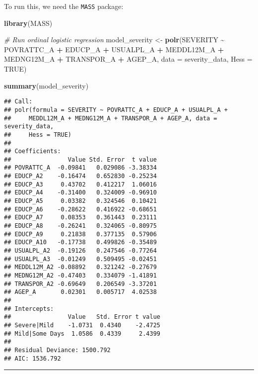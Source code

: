 \documentclass[
]{article}
\newenvironment{Shaded}{\begin{snugshade}}{\end{snugshade}}
\newcommand{\AttributeTok}[1]{\textcolor[rgb]{0.13,0.29,0.53}{#1}}
\newcommand{\CommentTok}[1]{\textcolor[rgb]{0.56,0.35,0.01}{\textit{#1}}}
\newcommand{\ConstantTok}[1]{\textcolor[rgb]{0.56,0.35,0.01}{#1}}
\newcommand{\FunctionTok}[1]{\textcolor[rgb]{0.13,0.29,0.53}{\textbf{#1}}}
\newcommand{\NormalTok}[1]{#1}
\newcommand{\OtherTok}[1]{\textcolor[rgb]{0.56,0.35,0.01}{#1}}
\newcommand{\SpecialCharTok}[1]{\textcolor[rgb]{0.81,0.36,0.00}{\textbf{#1}}}
\begin{document}
To run this, we need the \texttt{MASS} package:

\begin{Shaded}
\begin{Highlighting}[]
\FunctionTok{library}\NormalTok{(MASS)}

\CommentTok{\# Run ordinal logistic regression}
\NormalTok{model\_severity }\OtherTok{\textless{}{-}} \FunctionTok{polr}\NormalTok{(SEVERITY }\SpecialCharTok{\textasciitilde{}}\NormalTok{ POVRATTC\_A }\SpecialCharTok{+}\NormalTok{ EDUCP\_A }\SpecialCharTok{+}\NormalTok{ USUALPL\_A }\SpecialCharTok{+} 
\NormalTok{                         MEDDL12M\_A }\SpecialCharTok{+}\NormalTok{ MEDNG12M\_A }\SpecialCharTok{+}\NormalTok{ TRANSPOR\_A }\SpecialCharTok{+}\NormalTok{ AGEP\_A,}
                       \AttributeTok{data =}\NormalTok{ severity\_data,}
                       \AttributeTok{Hess =} \ConstantTok{TRUE}\NormalTok{)}

\FunctionTok{summary}\NormalTok{(model\_severity)}
\end{Highlighting}
\end{Shaded}

\begin{verbatim}
## Call:
## polr(formula = SEVERITY ~ POVRATTC_A + EDUCP_A + USUALPL_A + 
##     MEDDL12M_A + MEDNG12M_A + TRANSPOR_A + AGEP_A, data = severity_data, 
##     Hess = TRUE)
## 
## Coefficients:
##                Value Std. Error  t value
## POVRATTC_A  -0.09841   0.029086 -3.38334
## EDUCP_A2    -0.16474   0.652830 -0.25234
## EDUCP_A3     0.43702   0.412217  1.06016
## EDUCP_A4    -0.31400   0.324009 -0.96910
## EDUCP_A5     0.03382   0.324546  0.10421
## EDUCP_A6    -0.28622   0.416922 -0.68651
## EDUCP_A7     0.08353   0.361443  0.23111
## EDUCP_A8    -0.26241   0.324065 -0.80975
## EDUCP_A9     0.21838   0.377135  0.57906
## EDUCP_A10   -0.17738   0.499826 -0.35489
## USUALPL_A2  -0.19126   0.247546 -0.77264
## USUALPL_A3  -0.01249   0.509495 -0.02451
## MEDDL12M_A2 -0.08892   0.321242 -0.27679
## MEDNG12M_A2 -0.47403   0.334079 -1.41891
## TRANSPOR_A2 -0.69649   0.206549 -3.37201
## AGEP_A       0.02301   0.005717  4.02538
## 
## Intercepts:
##                Value   Std. Error t value
## Severe|Mild    -1.0731  0.4340    -2.4725
## Mild|Some Days  1.0586  0.4339     2.4399
## 
## Residual Deviance: 1500.792 
## AIC: 1536.792
\end{verbatim}

\begin{center}\rule{0.5\linewidth}{0.5pt}\end{center}
\end{document}
